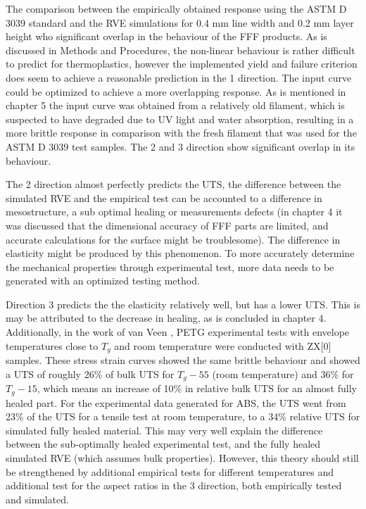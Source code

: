 The comparison between the empirically obtained response using the ASTM D 3039 standard and the RVE simulations for 0.4 mm line width and 0.2 mm layer height who significant overlap in the behaviour of the FFF products. As is discussed in Methods and Procedures, the non-linear behaviour is rather difficult to predict for thermoplastics, however the implemented yield and failure criterion does seem to achieve a reasonable prediction in the 1 direction. The input curve could be optimized to achieve a more overlapping response. As is mentioned in chapter 5 the input curve was obtained from a relatively old filament, which is suspected to have degraded due to UV light and water absorption, resulting in a more brittle response in comparison with the fresh filament that was used for the ASTM D 3039 test samples.
The 2 and 3 direction show significant overlap in its behaviour.

The 2 direction almost perfectly predicts the UTS, the difference between the simulated RVE and the empirical test can be accounted to a difference in mesostructure, a sub optimal healing or measurements defects (in chapter 4 it was discussed that the dimensional accuracy of FFF parts are limited, and accurate calculations for the surface might be troublesome). The difference in elasticity might be produced by this phenomenon. To more accurately determine the mechanical properties through experimental test, more data needs to be generated with an optimized testing method. 

Direction 3 predicts the the elasticity relatively well, but has a lower UTS. This is may be attributed to the decrease in healing, as is concluded in chapter 4. Additionally, in the work of van Veen \cite{Veen2019EnhancingTemperature}, PETG experimental tests with envelope temperatures close to $T_g$ and room temperature were conducted with ZX[0] samples. These stress strain curves showed the same brittle behaviour and showed a UTS of roughly 26\% of bulk UTS for $T_g-55$ (room temperature) and 36\% for $T_g-15$, which means an increase of 10\% in relative bulk UTS for an almost fully healed part. For the experimental data generated for ABS, the UTS went from 23\% of the UTS for a tensile test at room temperature, to a  34\% relative UTS for simulated fully healed material. This may very well explain the difference between the sub-optimally healed experimental test, and the fully healed simulated RVE (which assumes bulk properties). However, this theory should still be strengthened by additional empirical tests for different temperatures and additional test for the aspect ratios in the 3 direction, both empirically tested and simulated. 

